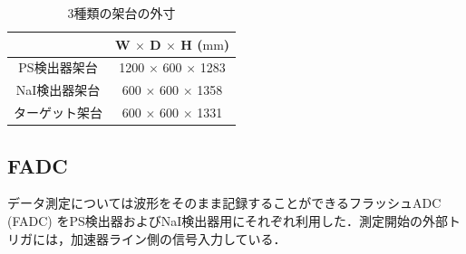       \begin{table}[H]
      \caption{3種類の架台の外寸}
      \label{tab:kadai}
      \centering
      \begin{tabular}{|c|c|}\hline
        &  W $\times$ D $\times$ H ($\mathrm{mm}$)\\ \hline
        PS検出器架台 &  1200 $\times$ 600 $\times$ 1283\\ \hline
        NaI検出器架台 & 600 $\times$ 600 $\times$ 1358 \\ \hline
        ターゲット架台 & 600 $\times$ 600 $\times$ 1331 \\ \hline
      \end{tabular}
    \end{table}

\subsection{FADC}
データ測定については波形をそのまま記録することができるフラッシュADC (FADC) をPS検出器およびNaI検出器用にそれぞれ利用した．測定開始の外部トリガには，加速器ライン側の信号入力している．
